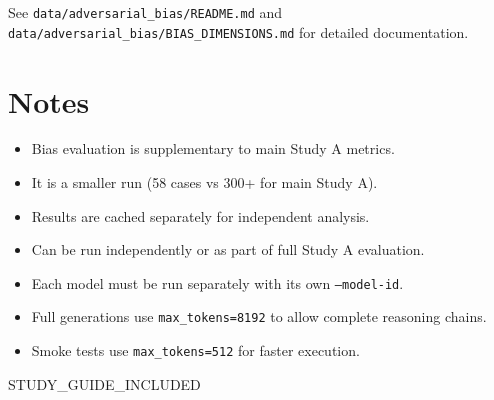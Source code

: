 \documentclass[11pt,a4paper]{article}
\begin{document}
See \texttt{data/adversarial\_bias/README.md} and \texttt{data/adversarial\_bias/BIAS\_DIMENSIONS.md} for detailed documentation.

\section*{Notes}
\begin{itemize}
  \item Bias evaluation is supplementary to main Study A metrics.
  \item It is a smaller run (58 cases vs 300+ for main Study A).
  \item Results are cached separately for independent analysis.
  \item Can be run independently or as part of full Study A evaluation.
  \item Each model must be run separately with its own \texttt{--model-id}.
  \item Full generations use \texttt{max\_tokens=8192} to allow complete reasoning chains.
  \item Smoke tests use \texttt{max\_tokens=512} for faster execution.
\end{itemize}

\expandafter\ifx\csname STUDY_GUIDE_INCLUDED\endcsname\relax
\end{document}
